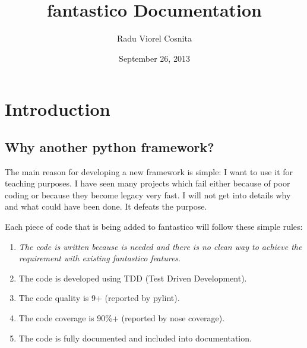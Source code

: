 \documentclass[letterpaper,10pt,english]{sphinxmanual}
\title{fantastico Documentation}
\date{September 26, 2013}
\author{Radu Viorel Cosnita}
\begin{document}
\maketitle
\tableofcontents
{}\label{index::doc}



\chapter{Introduction}
\label{intro:introduction}\label{intro::doc}\label{intro:fantastico-framework}

\section{Why another python framework?}
\label{intro:why-another-python-framework}
The main reason for developing a new framework is simple: I want to use it for teaching purposes. I have seen many projects which
fail either because of poor coding or because they become legacy very fast. I will not get into details why and what could have
been done. It defeats the purpose.

Each piece of code that is being added to fantastico will follow these simple rules:
\begin{enumerate}
\item {} 
\emph{The code is written because is needed and there is no clean way to achieve the requirement with existing fantastico features}.

\item {} 
The code is developed using TDD (Test Driven Development).

\item {} 
The code quality is 9+ (reported by pylint).

\item {} 
The code coverage is 90\%+ (reported by nose coverage).

\item {} 
The code is fully documented and included into documentation.

\end{enumerate}
\end{document}
